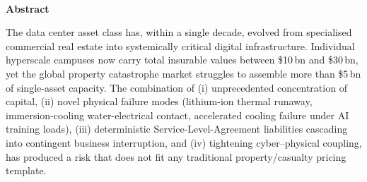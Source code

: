 \documentclass[11pt,a4paper]{article}
\theoremstyle{ia}
\newcommand{\1}{\mathbf{1}}
\begin{document}
\setcounter{page}{1}

\noindent{\color{iaaccent}\rule{2.2cm}{1.2pt}}\\[6pt]
{\sffamily\bfseries\large\color{iadark}Abstract}
\par\vspace{6pt}

\noindent
The data center asset class has, within a single decade, evolved from
specialised commercial real estate into systemically critical
digital infrastructure. Individual hyperscale campuses now carry total
insurable values between \$10\,bn and
\$30\,bn, yet the global property catastrophe
market struggles to assemble more than \$5\,bn of
single-asset capacity. The combination of (i) unprecedented
concentration of capital, (ii) novel physical failure modes
(lithium-ion thermal runaway, immersion-cooling water-electrical
contact, accelerated cooling failure under AI training loads),
(iii) deterministic Service-Level-Agreement liabilities cascading
into contingent business interruption, and (iv) tightening
cyber--physical coupling, has produced a risk that does not fit any
traditional property/casualty pricing template.
\end{document}
